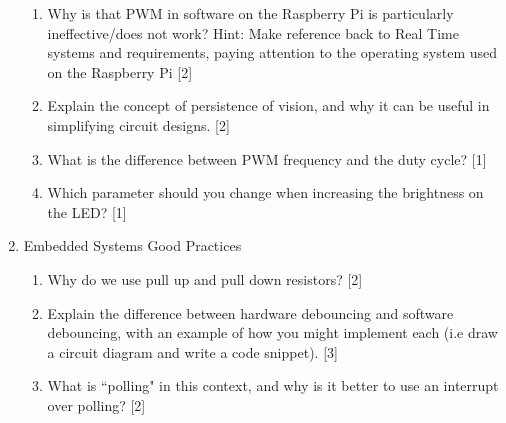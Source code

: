 \begin{enumerate}
    \begin{enumerate}
        \item Why is that PWM in software on the Raspberry Pi is particularly ineffective/does not work? Hint: Make reference back to Real Time systems and requirements, paying attention to the operating system used on the Raspberry Pi [2]
        \item Explain the concept of persistence of vision, and why it can be useful in simplifying circuit designs. [2]
        \item What is the difference between PWM frequency and the duty cycle? [1] 
        \item Which parameter should you change when increasing the brightness on the LED? [1]
    \end{enumerate}
    \item Embedded Systems Good Practices
    \begin{enumerate}
        \item Why do we use pull up and pull down resistors? [2]
        \item Explain the difference between hardware debouncing and software debouncing, with an example of how you might implement each (i.e draw a circuit diagram and write a code snippet). [3]
        \item What is ``polling" in this context, and why is it better to use an interrupt over polling? [2]
    \end{enumerate}
\end{enumerate}